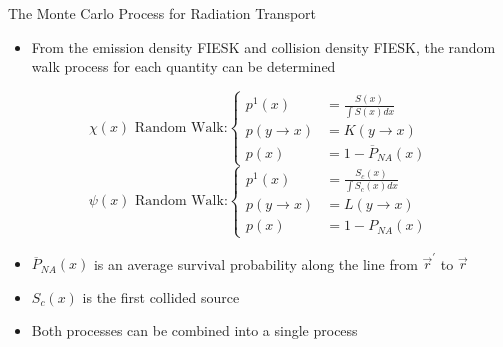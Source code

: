 \documentclass{beamer}
\begin{document}
\begin{frame}{The Monte Carlo Process for Radiation Transport}

  \begin{itemize}
    \item From the emission density FIESK and collision density FIESK, the
      random walk process for each quantity can be determined
  \end{itemize}

  \begin{equation*}
    \chi(x)\text{ Random Walk:}
    \begin{cases}
      p^1(x) & = \frac{S(x)}{\int S(x)dx} \\
      p(y \to x) &  = K(y \to x) \\
      p(x) & = 1 - \overline{P}_{NA}(x)
    \end{cases}
  \end{equation*}
  \medskip
  \begin{equation*}
    \psi(x)\text{ Random Walk:}
    \begin{cases}
      p^1(x) & = \frac{S_c(x)}{\int S_c(x)dx} \\
      p(y \to x) & = L(y \to x) \\
      p(x) & = 1 - P_{NA}(x)
    \end{cases}
  \end{equation*}

  \begin{itemize}
    \item $\overline{P}_{NA}(x)$ is an average survival probability along the 
      line from $\vec{r}^{'}$ to $\vec{r}$
      \medskip
    \item $S_c(x)$ is the first collided source
      \medskip
    \item Both processes can be combined into a single process
  \end{itemize}
    
\end{frame}
\end{document}
